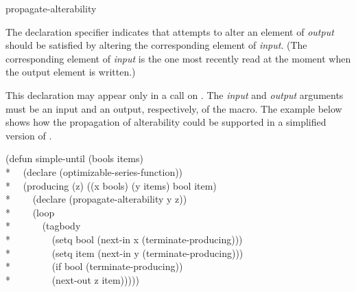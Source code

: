 \begin{defun}
propagate-alterability

The declaration specifier
indicates that attempts to alter an element of {\it output} should be
satisfied by altering the corresponding element of {\it input}.    (The
corresponding element of {\it input} is the one most recently read at the
moment when the output element is written.)

This declaration may
appear only in a call on .  The {\it input} and {\it output} arguments must be
an input and an output, respectively, of the  macro.  The example below shows how
the propagation of alterability could be supported in a simplified version
of .
\begin{lisp}
(defun simple-until (bools items) \\*
~~(declare (optimizable-series-function)) \\*
~~(producing (z) ((x bools) (y items) bool item) \\*
~~~~(declare (propagate-alterability y z)) \\*
~~~~(loop \\*
~~~~~~(tagbody \\*
~~~~~~~~(setq bool (next-in x (terminate-producing))) \\*
~~~~~~~~(setq item (next-in y (terminate-producing))) \\*
~~~~~~~~(if bool (terminate-producing)) \\*
~~~~~~~~(next-out z item)))))
\end{lisp}
\end{defun}

